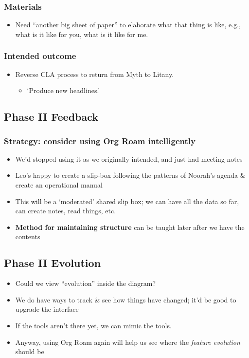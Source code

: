 \documentclass{article}
\begin{document}
\subsubsection{Materials}
\begin{itemize}
\item Need ``another big sheet of paper'' to elaborate what that thing is like, e.g., what is it like for you, what is it like for me.
\end{itemize}

\subsubsection{Intended outcome}
\begin{itemize}
\item Reverse CLA process to return from Myth to Litany.
\begin{itemize}
\item ‘Produce new headlines.’
\end{itemize}
\end{itemize}

\subsection{Phase II Feedback}

\subsubsection{Strategy: consider using Org Roam intelligently}

\begin{itemize}
\item We’d stopped using it as we originally intended, and just had meeting notes
\item Leo’s happy to create a slip-box following the patterns of Noorah’s agenda \& create an operational manual
\item This will be a ‘moderated’ shared slip box; we can have all the data so far, can create notes, read things, etc.
\item \textbf{Method for maintaining structure} can be taught later after we have the contents
\end{itemize}

\subsection{Phase II Evolution}

\begin{itemize}
\item Could we view ``evolution'' inside the diagram?
\item We do have ways to track \& see how things have changed; it'd be good to upgrade the interface
\item If the tools aren't there yet, we can mimic the tools.
\item Anyway, using Org Roam again will help us see where the \emph{feature evolution} should be
\end{itemize}
\end{document}
